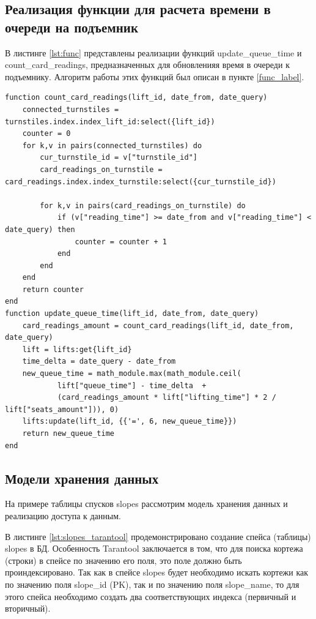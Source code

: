 \subsection{Реализация функции для расчета времени в очереди на подъемник}

В листинге \ref{lst:func} представлены реализации функций update\_queue\_time и count\_card\_readings, предназначенных для обновленияя время в очереди к подъемнику. Алгоритм работы этих функций был описан в пункте \ref{func_label}.


\captionsetup{justification=centering,singlelinecheck=off}
\begin{lstlisting}[label=lst:func, caption=Функции update\_queue\_time и count\_card\_readings, style=myLuastyle]
function count_card_readings(lift_id, date_from, date_query)
	connected_turnstiles = turnstiles.index.index_lift_id:select({lift_id})
	counter = 0
	for k,v in pairs(connected_turnstiles) do
		cur_turnstile_id = v["turnstile_id"]
		card_readings_on_turnstile = card_readings.index.index_turnstile:select({cur_turnstile_id})
		
		for k,v in pairs(card_readings_on_turnstile) do
			if (v["reading_time"] >= date_from and v["reading_time"] < date_query) then
				counter = counter + 1
			end
		end
	end
	return counter
end
function update_queue_time(lift_id, date_from, date_query)
	card_readings_amount = count_card_readings(lift_id, date_from, date_query)
	lift = lifts:get{lift_id}
	time_delta = date_query - date_from
	new_queue_time = math_module.max(math_module.ceil(
			lift["queue_time"] - time_delta  + 
			(card_readings_amount * lift["lifting_time"] * 2 / lift["seats_amount"])), 0)
	lifts:update(lift_id, {{'=', 6, new_queue_time}})
	return new_queue_time
end
\end{lstlisting}

\subsection{Модели хранения данных}

На примере таблицы спусков slopes рассмотрим модель хранения данных и реализацию доступа к данным.

В листинге \ref{lst:slopes_tarantool} продемонстрировано создание спейса (таблицы) slopes в БД. Особенность Tarantool заключается в том, что для поиска кортежа (строки) в спейсе по значению его поля, это поле должно быть проиндексировано. Так как в спейсе slopes будет необходимо искать кортежи как по значению поля slope\_id (PK), так и по значению поля slope\_name, то для этого спейса необходимо создать два соответствующих индекса (первичный и вторичный).

